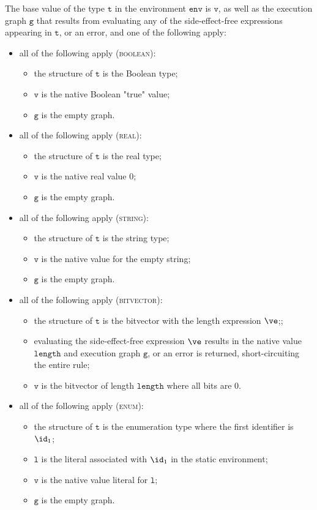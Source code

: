 \documentclass{book}
\newcommand\env[0]{\texttt{env}}
\newcommand\vg[0]{\texttt{g}}
\newcommand\vl[0]{\texttt{l}}
\newcommand\vv[0]{\texttt{v}}
\newcommand\vt[0]{\texttt{t}}
\newcommand\length[0]{\texttt{length}}
\begin{document}
The base value of the type $\vt$ in the environment $\env$ is $\vv$,
as well as the execution graph $\vg$ that results
from evaluating any of the side-effect-free expressions appearing in $\vt$,
or an error, and one of the following apply:
\begin{itemize}
  \item all of the following apply (\textsc{boolean}):
  \begin{itemize}
    \item the structure of $\vt$ is the Boolean type;
    \item $\vv$ is the native Boolean "true" value;
    \item $\vg$ is the empty graph.
  \end{itemize}

  \item all of the following apply (\textsc{real}):
  \begin{itemize}
    \item the structure of $\vt$ is the real type;
    \item $\vv$ is the native real value $0$;
    \item $\vg$ is the empty graph.
  \end{itemize}

  \item all of the following apply (\textsc{string}):
  \begin{itemize}
    \item the structure of $\vt$ is the string type;
    \item $\vv$ is the native value for the empty string;
    \item $\vg$ is the empty graph.
  \end{itemize}

  \item all of the following apply (\textsc{bitvector}):
  \begin{itemize}
    \item the structure of $\vt$ is the bitvector with the length expression $\ve$;;
    \item evaluating the side-effect-free expression $\ve$ results in the native value $\length$
    and execution graph $\vg$,
    or an error is returned, short-circuiting the entire rule;
    \item $\vv$ is the bitvector of length $\length$ where all bits are $0$.
  \end{itemize}

  \item all of the following apply (\textsc{enum}):
  \begin{itemize}
    \item the structure of $\vt$ is the enumeration type where the first identifier is $\id_1$;
    \item $\vl$ is the literal associated with $\id_1$ in the static environment;
    \item $\vv$ is the native value literal for $\vl$;
    \item $\vg$ is the empty graph.
  \end{itemize}


\end{itemize}
\end{document}
